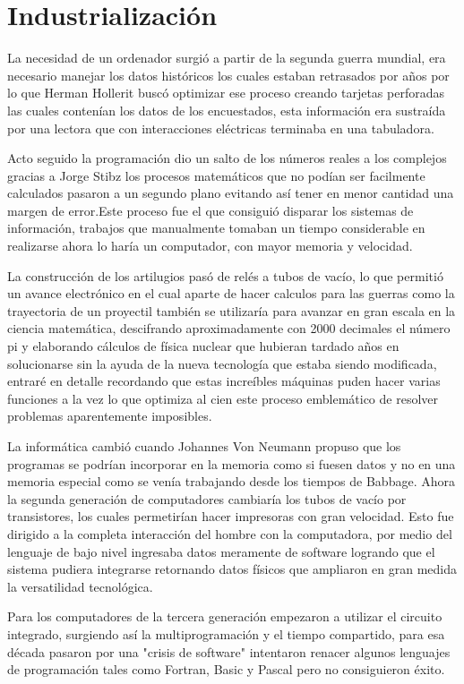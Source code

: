 \documentclass[11pt]{article}
\begin{document}
\section{Industrialización}

La necesidad de un ordenador surgió a partir de la segunda guerra mundial, era necesario manejar los datos históricos los cuales estaban retrasados por años por lo que Herman Hollerit  buscó optimizar ese proceso creando tarjetas perforadas las cuales contenían los datos de los encuestados, esta información era sustraída por una lectora que con interacciones eléctricas terminaba en una tabuladora.

Acto seguido la programación dio un salto de los números reales a los complejos gracias a Jorge Stibz los procesos matemáticos que no podían ser facilmente calculados pasaron a un segundo plano evitando así tener en menor cantidad una margen de error.Este proceso fue el que consiguió  disparar los sistemas de información, trabajos que manualmente tomaban un tiempo considerable en realizarse ahora lo haría un computador, con mayor memoria y velocidad.

La construcción de los artilugios pasó de relés a tubos de vacío, lo que permitió un avance electrónico en el cual aparte de hacer calculos para las guerras como la trayectoria de un proyectil también se utilizaría para avanzar en gran escala en la ciencia matemática, descifrando aproximadamente con 2000 decimales el número pi y elaborando cálculos de física nuclear que hubieran tardado años en solucionarse sin la ayuda de la nueva tecnología que estaba siendo modificada, entraré en detalle recordando que estas increíbles máquinas puden hacer varias funciones a la vez lo que optimiza al cien este proceso emblemático de resolver problemas aparentemente imposibles. 

La informática cambió cuando Johannes Von Neumann propuso que los programas se podrían incorporar en la memoria como si fuesen datos y no en una memoria especial como se venía trabajando desde los tiempos de Babbage. Ahora la segunda generación de computadores cambiaría los tubos de vacío por transistores, los cuales permetirían hacer impresoras con gran velocidad. Esto fue dirigido a la completa interacción del hombre con la computadora, por medio del lenguaje de bajo nivel ingresaba datos meramente de software logrando que el sistema pudiera integrarse retornando datos físicos 
que ampliaron en gran medida la versatilidad tecnológica.

Para los computadores de la tercera generación empezaron a utilizar el circuito integrado, surgiendo así la multiprogramación y el tiempo compartido, para esa década pasaron por una "crisis de software" intentaron renacer algunos lenguajes de programación tales como  Fortran, Basic y Pascal pero no consiguieron éxito.
\end{document}
